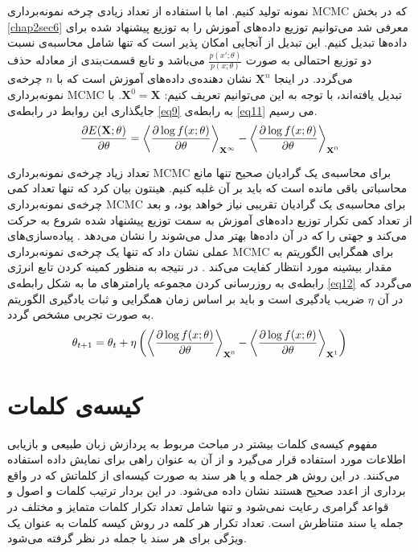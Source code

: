 نمونه تولید کنیم. اما با استفاده از تعداد زیادی چرخه نمونه‌برداری
MCMC
که در بخش
\ref{chap2sec6}
معرفی‌ شد می‌توانیم توزیع داده‌های آموزش  را به توزیع پیشنهاد شده برای داده‌ها تبدیل کنیم. این تبدیل از آنجایی امکان پذیر است که تنها شامل محاسبه‌ی نسبت دو توزیع احتمالی‌ به صورت
$\frac{p(x';\theta)}{p(x;\theta)}$
می‌باشد و تابع قسمت‌بندی از معادله حذف می‌‌گردد. در اینجا
$\textbf{X}^n$
نشان دهنده‌ی داده‌های آموزش است که با
$n$ 
چرخه‌ی نمونه‌برداری
MCMC
تبدیل یافته‌اند، با توجه به این می‌‌توانیم تعریف کنیم‌:
$\textbf{X}^0 = \textbf{X}$.
با جایگذاری این روابط در رابطه‌ی
\ref{eq9}
به رابطه‌ی
\ref{eq11}
می‌ رسیم.
\begin{align}
\centering
\label{eq11}
	\dfrac{\partial E(\textbf{X};\theta)}{\partial \theta} = \left\langle \dfrac{\partial \log f(x; \theta)}{\partial \theta} \right\rangle_{\textbf{X}^{\infty}} - \left\langle \dfrac{\partial \log f(x;\theta)}{\partial \theta}\right\rangle_{\textbf{X}^0}
\end{align}

تعداد زیاد چرخه‌‌ی نمونه‌برداری
MCMC
برای محاسبه‌ی یک گرادیان صحیح تنها مانع محاسباتی باقی‌ مانده است که باید بر آن غلبه کنیم. هینتون بیان کرد که تنها تعداد کمی چرخه‌ی نمونه‌برداری
MCMC
برای محاسبه‌ی یک گرادیان تقریبی نیاز خواهد بود، و بعد از تعداد کمی‌ تکرار توزیع داده‌های آموزش به سمت توزیع پیشنهاد شده شروع به حرکت می‌‌کند و جهتی‌ را که در آن داد‌ه‌ها بهتر مدل می‌شوند را نشان می‌‌دهد
\cite{hinton2002training}\cite{carreira2005contrastive}.
پیاده‌سازی‌های عملی‌ نشان داد که تنها یک چرخه‌ی نمونه‌برداری
MCMC
برای همگرایی الگوریتم به مقدار بیشینه مورد انتظار کفایت می‌‌کند
\cite{carreira2005contrastive}.
در نتیجه به منظور کمینه کردن تابع انرژی رابطه‌ی به روز‌رسانی کردن مجموعه پارامتر‌های ما به شکل رابطه‌ی
\ref{eq12}
می‌گردد که در آن
$\eta$
ضریب یادگیری است و باید بر اساس زمان همگرایی و ثبات یادگیری الگوریتم به صورت تجربی‌ مشخص گردد.
\begin{align}
\centering
\label{eq12}
	\theta_{t+1} = \theta_t + \eta \left(  \left\langle \dfrac{\partial \log f(x; \theta)}{\partial \theta} \right\rangle_{\textbf{X}^0} - \left\langle \dfrac{\partial \log f(x;\theta)}{\partial \theta}\right\rangle_{\textbf{X}^1}  \right) 
\end{align}

\section{کیسه‌ی کلمات}
\label{chap2sec10}
مفهوم کیسه‌ی کلمات
 بیشتر در مباحث مربوط به پردازش زبان طبیعی و بازیابی اطلاعات
مورد استفاده قرار می‌‌گیرد و از آن به عنوان راهی‌ برای نمایش داده استفاده می‌‌کنند. در این روش هر جمله و یا هر سند به صورت کیسه‌ای از کلماتش که در واقع برداری از اعدد صحیح هستند نشان داده می‌‌شود. در این بردار ترتیب کلمات و اصول و قواعد گرامری رعایت نمی‌‌شود و تنها شامل تعداد تکرار کلمات متمایز و مختلف در جمله یا سند  متناظرش است. تعداد تکرار هر کلمه در روش کیسه کلمات به عنوان یک ویژگی‌ برای هر سند یا جمله در نظر گرفته می‌‌شود.

